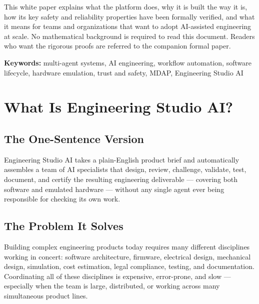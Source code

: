 \documentclass[12pt]{article}
\begin{document}
\medskip\noindent
This white paper explains what the platform does, why it is built the
way it is, how its key safety and reliability properties have been
formally verified, and what it means for teams and organizations that
want to adopt AI-assisted engineering at scale.
No mathematical background is required to read this document.
Readers who want the rigorous proofs are referred to the companion
formal paper.

\bigskip
\noindent\textbf{Keywords:}
multi-agent systems,
AI engineering,
workflow automation,
software lifecycle,
hardware emulation,
trust and safety,
MDAP,
Engineering Studio AI

\newpage

\tableofcontents
\newpage

\section{What Is Engineering Studio AI?}
\label{sec:what}

\subsection{The One-Sentence Version}

Engineering Studio AI takes a plain-English product brief and
automatically assembles a team of AI specialists that design, review,
challenge, validate, test, document, and certify the resulting
engineering deliverable --- covering both software and emulated
hardware --- without any single agent ever being responsible for
checking its own work.

\subsection{The Problem It Solves}

Building complex engineering products today requires many different
disciplines working in concert: software architecture, firmware,
electrical design, mechanical design, simulation, cost estimation,
legal compliance, testing, and documentation.
Coordinating all of these disciplines is expensive, error-prone, and
slow --- especially when the team is large, distributed, or
working across many simultaneous product lines.
\end{document}
